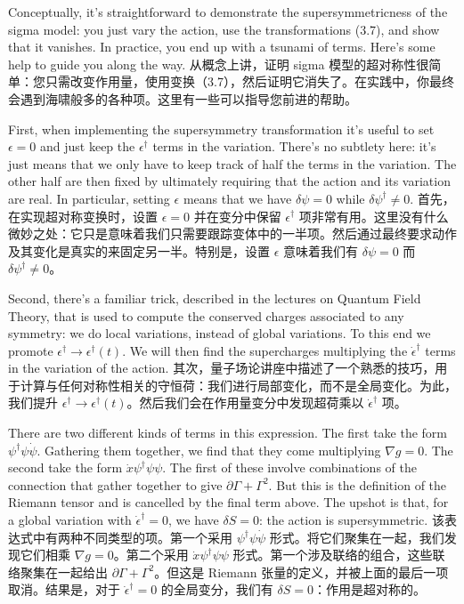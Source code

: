 \documentclass{ctexart}
\begin{document}
\begin{paracol}{2}
Conceptually, it’s straightforward to demonstrate the supersymmetricness of the sigma model: you just vary the action, use the transformations (3.7), and show that it vanishes. In practice, you end up with a tsunami of terms. Here’s some help to guide you along the way.
\switchcolumn
从概念上讲，证明 sigma 模型的超对称性很简单：您只需改变作用量，使用变换（3.7），然后证明它消失了。在实践中，你最终会遇到海啸般多的各种项。这里有一些可以指导您前进的帮助。
\switchcolumn*

First, when implementing the supersymmetry transformation it’s useful to set $\epsilon = 0$ and just keep the $\epsilon^{\dagger}$ terms in the variation. There’s no subtlety here: it’s just means that we only have to keep track of half the terms in the variation. The other half are then fixed by ultimately requiring that the action and its variation are real. In particular, setting $\epsilon$ means that we have $\delta \psi = 0$ while $\delta \psi^{\dagger} \neq 0$.
\switchcolumn
首先，在实现超对称变换时，设置 $\epsilon = 0$ 并在变分中保留 $\epsilon^{\dagger}$ 项非常有用。这里没有什么微妙之处：它只是意味着我们只需要跟踪变体中的一半项。然后通过最终要求动作及其变化是真实的来固定另一半。特别是，设置 $\epsilon$ 意味着我们有 $\delta \psi = 0$ 而 $\delta \psi^{\dagger} \neq 0$。
\switchcolumn*

Second, there’s a familiar trick, described in the lectures on Quantum Field Theory, that is used to compute the conserved charges associated to any symmetry: we do local variations, instead of global variations. To this end we promote $\epsilon^{\dagger} \to \epsilon^{\dagger}(t)$. We will then find the supercharges multiplying the $\dot{\epsilon}^{\dagger}$ terms in the variation of the action.
\switchcolumn
其次，量子场论讲座中描述了一个熟悉的技巧，用于计算与任何对称性相关的守恒荷：我们进行局部变化，而不是全局变化。为此，我们提升 $\epsilon^{\dagger} \to \epsilon^{\dagger}(t)$。然后我们会在作用量变分中发现超荷乘以 $\dot{\epsilon}^{\dagger}$ 项。
\switchcolumn*

There are two different kinds of terms in this expression. The first take the form $\psi^{\dagger} \psi \dot{\psi}$. Gathering them together, we find that they come multiplying $\nabla g = 0$. The second take the form $\dot{x} \psi^{\dagger} \psi \psi$. The first of these involve combinations of the connection that gather together to give $\partial \Gamma + \Gamma^2$. But this is the definition of the Riemann tensor and is cancelled by the final term above. The upshot is that, for a global variation with $\dot{\epsilon}^{\dagger} = 0$, we have $\delta S = 0$: the action is supersymmetric.
\switchcolumn
该表达式中有两种不同类型的项。第一个采用 $\psi^{\dagger} \psi \dot{\psi}$ 形式。将它们聚集在一起，我们发现它们相乘 $\nabla g = 0$。第二个采用 $\dot{x} \psi^{\dagger} \psi \psi$ 形式。第一个涉及联络的组合，这些联络聚集在一起给出 $\partial \Gamma + \Gamma^2$。但这是 Riemann 张量的定义，并被上面的最后一项取消。结果是，对于 $\dot{\epsilon}^{\dagger} = 0$ 的全局变分，我们有 $\delta S = 0$：作用是超对称的。
\switchcolumn*


\end{paracol}
\end{document}

